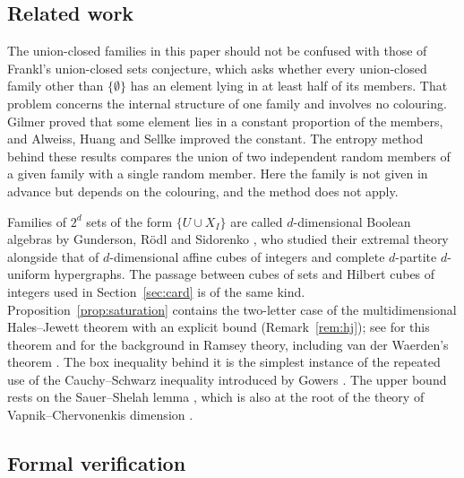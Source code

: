 \documentclass[11pt,reqno]{amsart}
\numberwithin{equation}{section}
\theoremstyle{plain}
\theoremstyle{definition}
\theoremstyle{remark}
\begin{document}
\subsection{Related work}

The union-closed families in this paper should not be confused with
those of Frankl's union-closed sets conjecture, which asks whether every
union-closed family other than $\{\emptyset\}$ has an element lying in at
least half of its members. That problem concerns the internal structure
of one family and involves no colouring. Gilmer \cite{Gi22} proved that
some element lies in a constant proportion of the members, and Alweiss,
Huang and Sellke \cite{AHS24} improved the constant. The entropy method
behind these results compares the union of two independent random
members of a given family with a single random member. Here the family
is not given in advance but depends on the colouring, and the method does
not apply.

Families of $2^{d}$ sets of the form $\{U\cup X_I\}$ are called
$d$-dimensional Boolean algebras by Gunderson, R\"odl and Sidorenko
\cite{GRS99}, who studied their extremal theory alongside that of
$d$-dimensional affine cubes of integers and complete $d$-partite
$d$-uniform hypergraphs. The passage between cubes of sets and Hilbert
cubes of integers used in Section~\ref{sec:card} is of the same kind.
Proposition~\ref{prop:saturation} contains the two-letter case of the
multidimensional Hales--Jewett theorem \cite{HJ63} with an explicit bound
(Remark~\ref{rem:hj}); see \cite{GRS90} for this theorem and for the
background in Ramsey theory, including van der Waerden's theorem
\cite{vdW27}. The box inequality behind it is the simplest instance of the
repeated use of the Cauchy--Schwarz inequality introduced by Gowers
\cite{Go01}. The upper bound rests on the Sauer--Shelah lemma
\cite{Sa72,Sh72}, which is also at the root of the theory of
Vapnik--Chervonenkis dimension \cite{VC71}.

\subsection{Formal verification}
\end{document}
